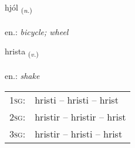 \documentclass[frontgrid, backgrid]{flacards}\usepackage[]{graphicx}\usepackage[]{xcolor}
\begin{document}
\renewcommand{\flhead}{\vskip5pt \fboxsep=0pt {\small\bfseries\footnotesize Nafnorð | Noun}}
\renewcommand{\fcfoot}{\vskip5pt \fboxsep=0pt \hspace{2pt}{\small\bfseries\footnotesize 2K}}

\renewcommand{\blhead}{\vskip5pt {\small\bfseries\footnotesize Nafnorð | Noun }}
\renewcommand{\bcfoot}{\vskip5pt \hspace{2pt}{\small\bfseries\footnotesize 2K}}


{hjól \small{\textsubscript{(\textit{n.})}} \\[1ex] %
\textphonetic{[çouːl]} \\
en.: \emph{bicycle; wheel} \\  [2ex]
\renewcommand*{\arraystretch}{0.8}
}

\renewcommand{\flhead}{\vskip5pt \fboxsep=0pt {\small\bfseries\footnotesize Sagnorð | Verb}}
\renewcommand{\fcfoot}{\vskip5pt \fboxsep=0pt \hspace{2pt}{\small\bfseries\footnotesize 2K}}

\renewcommand{\blhead}{\vskip5pt {\small\bfseries\footnotesize Sagnorð | Verb }}
\renewcommand{\bcfoot}{\vskip5pt \hspace{2pt}{\small\bfseries\footnotesize 2K}}


{hrista \small{\textsubscript{(\textit{v.})}} \\[1ex] %
\textphonetic{[r̥ɪsta]} \\
en.: \emph{shake} \\  [2ex]
\renewcommand*{\arraystretch}{0.8}
\begin{tabular}{p{1cm}l}
\textsc{1sg}: & hristi -- hristi -- hrist \\ 
\textsc{2sg}: & hristir -- hristir -- hrist \\ 
\textsc{3sg}: & hristir -- hristi -- hrist \\ 
\end{tabular}
}
\end{document}

